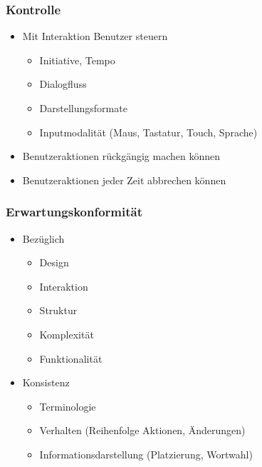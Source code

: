 \documentclass{article}
\begin{document}
\subsubsection{Kontrolle}

\begin{itemize}
	\item Mit Interaktion Benutzer steuern
	\begin{itemize}
		\item Initiative, Tempo
		\item Dialogfluss
		\item Darstellungsformate
		\item Inputmodalität (Maus, Tastatur, Touch, Sprache)
	\end{itemize}
	
	\item Benutzeraktionen rückgängig machen können
	\item Benutzeraktionen jeder Zeit abbrechen können
\end{itemize}

\subsubsection{Erwartungskonformität}
\begin{itemize}
	\item Bezüglich
	\begin{itemize}
		\item Design
		\item Interaktion
		\item Struktur
		\item Komplexität
		\item Funktionalität
	\end{itemize}
	\item Konsistenz
	\begin{itemize}
		\item Terminologie
		\item Verhalten (Reihenfolge Aktionen, Änderungen)
		\item Informationsdarstellung (Platzierung, Wortwahl)
	\end{itemize}
\end{itemize}
\end{document}
